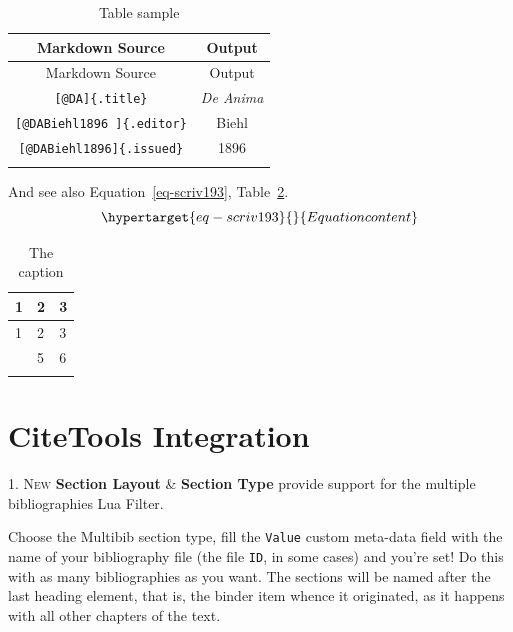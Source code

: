 \documentclass[
  12pt,
  a4paper,
  oneside,
  titlepage,
  toclink=all,
  toc=bibliography]{scrbook}
\theoremstyle{definition}
\theoremstyle{definition}
\theoremstyle{plain}
\theoremstyle{definition}
\theoremstyle{plain}
\theoremstyle{plain}
\theoremstyle{plain}
\theoremstyle{plain}
\theoremstyle{remark}
\begin{document}
\hypertarget{tbl-scriv192}{}
\begin{longtable}[]{@{}cc@{}}
\toprule\noalign{}
Markdown Source & Output \\
\midrule\noalign{}
\endfirsthead
\toprule\noalign{}
Markdown Source & Output \\
\midrule\noalign{}
\endhead
\bottomrule\noalign{}
\endlastfoot
\texttt{{[}@DA{]}\{.title\}} & \emph{De Anima} \\
\texttt{{[}@DABiehl1896\ {]}\{.editor\}} & Biehl \\
\texttt{{[}@DABiehl1896{]}\{.issued\}} & 1896 \\
\caption{\label{tbl-scriv192}Table sample}\tabularnewline
\end{longtable}

And see also
\protect\hypertarget{cite_59}{}{\label{cite_59}Equation~\ref{eq-scriv193}},
\protect\hypertarget{cite_60}{}{\label{cite_60}Table~\ref{tbl-scriv194}}.\\
\begin{equation}\protect\hypertarget{eq-scriv193}{}{Equation content
}\label{eq-scriv193}\end{equation}

\hypertarget{tbl-scriv194}{}
\begin{longtable}[]{@{}lll@{}}
\toprule\noalign{}
1 & 2 & 3 \\
\midrule\noalign{}
\endfirsthead
\toprule\noalign{}
1 & 2 & 3 \\
\midrule\noalign{}
\endhead
\bottomrule\noalign{}
\endlastfoot
4 & 5 & 6 \\
\caption{\label{tbl-scriv194}The caption}\tabularnewline
\end{longtable}

\hypertarget{sec-scriv195}{%
\section{CiteTools Integration}\label{sec-scriv195}}

\protect\hypertarget{scriv195}{}{}

\protect\hypertarget{scriv196}{}{} \textsc{1. New} \textbf{Section
Layout} \& \textbf{Section Type} provide support for the multiple
bibliographies Lua Filter.

Choose the Multibib section type, fill the \texttt{Value} custom
meta-data field with the name of your bibliography file (the file
\texttt{ID}, in some cases) and you're set! Do this with as many
bibliographies as you want. The sections will be named after the last
heading element, that is, the binder item whence it originated, as it
happens with all other chapters of the text.
\end{document}
